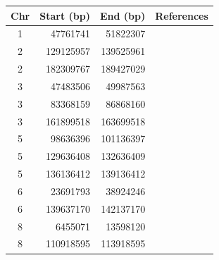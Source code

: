 \documentclass[12pt]{article}
\begin{document}
\begin{table}
\center
\begin{tabular}{crrl}
Chr & Start (bp) & End (bp) & References \\
\hline
1   & 47761741     & 51822307   &    \citep{weale2010, price2008, anderson2010} \\
2   & 129125957   & 139525961   &    \citep{conomos2016, novembre2008, raska2012, weale2010, price2008,   prive2018} \\
2   & 182309767    & 189427029   &    \citep{weale2010, price2008, anderson2010} \\
3   & 47483506     & 49987563    &  \citep{weale2010, price2008, anderson2010} \\
3   & 83368159     & 86868160    &   \citep{weale2010, price2008, anderson2010} \\
3   & 161899518    &   163699518   &    \citep{prive2018} \\
5   & 98636396     &  101136397   &    \citep{weale2010, price2008} \\
5   & 129636408    &   132636409   &    \citep{weale2010, price2008, anderson2010} \\
5   & 136136412    &   139136412   &   \citep{weale2010, price2008} \\
6   &  23691793     &   38924246   &    \citep{conomos2016, fellay2007, novembre2008, raska2012, weale2010,  price2008, anderson2010, prive2018} \\
6   & 139637170    &   142137170   &    \citep{weale2010, price2008, anderson2010}  \\
8   &   6455071      &  13598120   &    \citep{conomos2016, fellay2007, novembre2008, raska2012, weale2010, tian2008,  price2008, anderson2010,  prive2018} \\
8   & 110918595    &   113918595    &  \citep{weale2010, price2008, anderson2010} \\

\end{tabular}
\end{table}
\end{document}
